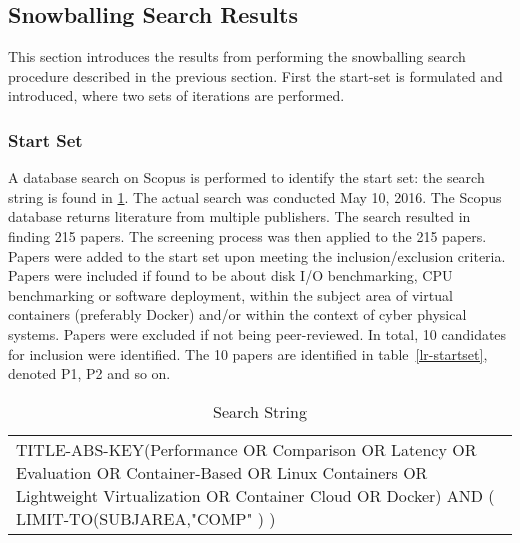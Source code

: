 

\subsection{Snowballing Search Results}
This section introduces the results from performing the snowballing search procedure described in the previous section. First the start-set is formulated and introduced, where two sets of iterations are performed. 

\subsubsection*{Start Set}
A database search on Scopus \cite{scopus} is performed to identify the start set: the search string is found in \ref{search-string}.  The actual search was conducted May 10, 2016. The Scopus database returns literature from multiple publishers. The search resulted in finding 215 papers. The screening process was then applied to the 215 papers. Papers were added to the start set upon meeting the inclusion/exclusion criteria. Papers were included if found to be about disk I/O benchmarking, CPU benchmarking or software deployment, within the subject area of virtual containers (preferably Docker) and/or within the context of cyber physical systems. Papers were excluded if not being peer-reviewed. In total, 10 candidates for inclusion were identified. The 10 papers are identified in table~\ref{lr-startset}, denoted P1, P2 and so on.

\begin{table}[]
\centering
\begin{tabular}{p{15cm}}
TITLE-ABS-KEY(Performance OR Comparison OR Latency OR Evaluation OR Container-Based OR Linux Containers OR Lightweight Virtualization OR Container Cloud OR Docker) AND ( LIMIT-TO(SUBJAREA,"COMP" ) )
\end{tabular}
\caption{Search String}
\label{search-string}
\end{table}


